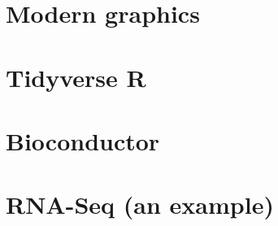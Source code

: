 \documentclass[
]{book}
\begin{document}
\hypertarget{modern-graphics}{%
\chapter{Modern graphics}\label{modern-graphics}}

\hypertarget{tidyverse-r}{%
\chapter{Tidyverse R}\label{tidyverse-r}}

\hypertarget{bioconductor}{%
\chapter{Bioconductor}\label{bioconductor}}

\hypertarget{rna-seq-an-example}{%
\chapter{RNA-Seq (an example)}\label{rna-seq-an-example}}

  
\end{document}
